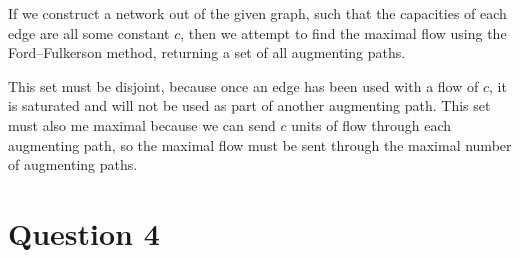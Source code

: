 \documentclass{article}
\begin{document}
If we construct a network out of the given graph, such that the capacities of each edge are all some constant \(c\), then we attempt to find the maximal flow using the Ford–Fulkerson method, returning a set of all augmenting paths.

This set must be disjoint, because once an edge has been used with a flow of \(c\), it is saturated and will not be used as part of another augmenting path. This set must also me maximal because we can send \(c\) units of flow through each augmenting path, so the maximal flow must be sent through the maximal number of augmenting paths.

\section*{Question 4}
\end{document}
